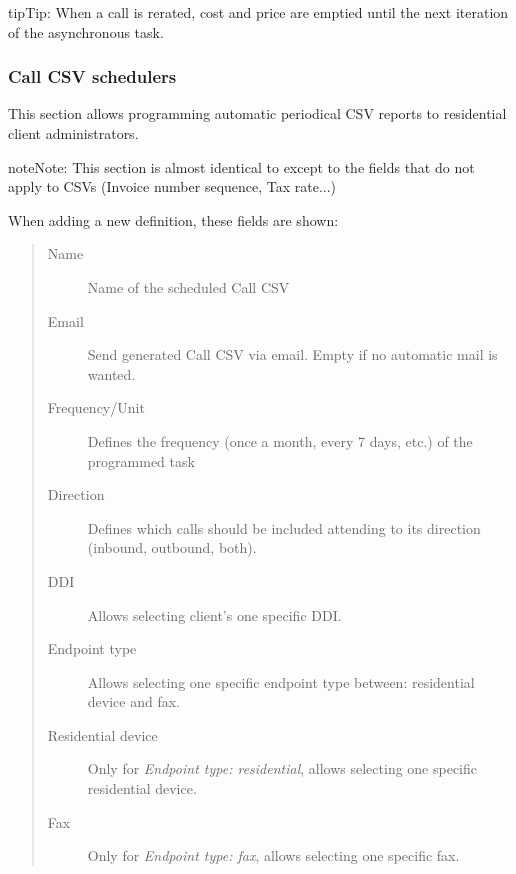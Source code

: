 \documentclass[letterpaper,10pt,english]{sphinxmanual}
\begin{document}
\begin{notice}{tip}{Tip:}
When a call is rerated, cost and price are emptied until the next iteration of the asynchronous task.
\end{notice}


\subsubsection{Call CSV schedulers}
\label{administration_portal/client/residential/calls/call_csv_schedulers:call-csv-schedulers}\label{administration_portal/client/residential/calls/call_csv_schedulers::doc}
This section allows programming automatic periodical CSV reports to residential client administrators.

\begin{notice}{note}{Note:}
This section is almost identical to {\hyperref[administration_portal/brand/invoicing/invoice_schedulers:invoice\string-schedulers]{}} except to the
fields that do not apply to CSVs (Invoice number sequence, Tax rate...)
\end{notice}

When adding a new definition, these fields are shown:
\begin{quote}
\begin{description}
\item[{Name}] \leavevmode
Name of the scheduled Call CSV

\item[{Email}] \leavevmode
Send generated Call CSV via email. Empty if no automatic mail is wanted.

\item[{Frequency/Unit}] \leavevmode
Defines the frequency (once a month, every 7 days, etc.) of the programmed task

\item[{Direction}] \leavevmode
Defines which calls should be included attending to its direction (inbound, outbound, both).

\item[{DDI}] \leavevmode
Allows selecting client's one specific DDI.

\item[{Endpoint type}] \leavevmode
Allows selecting one specific endpoint type between: residential device and fax.

\item[{Residential device}] \leavevmode
Only for \emph{Endpoint type: residential}, allows selecting one specific residential device.

\item[{Fax}] \leavevmode
Only for \emph{Endpoint type: fax}, allows selecting one specific fax.

\end{description}
\end{quote}
\end{document}
